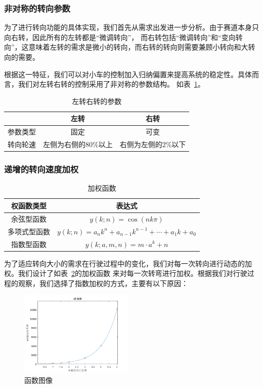 \documentclass[a4paper,twoside,zihao=5,UTF8]{ctexart}
\begin{document}
\begin{spacing}{1.2}
\subsubsection{非对称的转向参数}

为了进行转向功能的具体实现，我们首先从需求出发进一步分析。由于赛道本身只向右转，因此所有的左转都是“微调转向”，
而右转包括“微调转向”和“变向转向”，这意味着左转的需求是微小的转向，而右转的转向则需要兼顾小转向和大转向的需要。

根据这一特征，我们可以对小车的控制加入归纳偏置来提高系统的稳定性。具体而言，我们对左转右转的控制采用了非对称的参数结构。
如表~\ref{tbl:turnparam}。

\begin{table}[htb]
	\centering
	\caption{左转右转的参数}
	\label{tbl:turnparam}
	\begin{tabular}{c|c|c}
		\toprule
		\hline
		& 左转 & 右转 \\
		\hline
		参数类型 & 固定 & 可变 \\
		\hline
		转向轮速 & 左侧为右侧的80\%以上 & 右侧为左侧的2\%以下 \\
		\hline
		\bottomrule
	\end{tabular}
\end{table}

\subsubsection{递增的转向速度加权}

\begin{table}[htb]
	\centering
	\caption{加权函数}
	\label{tbl:weight}
	\renewcommand\arraystretch{1.5}
	\begin{tabular}{c|c}
		\toprule
		\hline
		权函数类型 & 表达式 \\
		\hline
		余弦型函数 & $y(k;n)=\cos(nk\pi)$ \\
		\hline
		多项式型函数 & $y(k;n)=a_nk^n+a_{n-1}k^{n-1}+\cdots+a_1k+a_0$ \\
		\hline
		指数型函数 & $y(k;a,m,n)=m\cdot a^k+n$ \\
		\hline
		\bottomrule
	\end{tabular}
\end{table}

为了适应转向大小的需求在行驶过程中的变化，我们对每一次转向进行动态的加权。我们设计了如表~\ref{tbl:weight}的加权函数
来对每一次转弯进行加权。根据我们对行驶过程的观察，我们选择了指数加权的方式，主要有以下原因：

\begin{figure}[htb]
	\centering
	\caption{函数图像}
	\label{fig:weight}
	\includegraphics[width=0.48\textwidth]{weight.png}
\end{figure}


\end{spacing}
\end{document}
